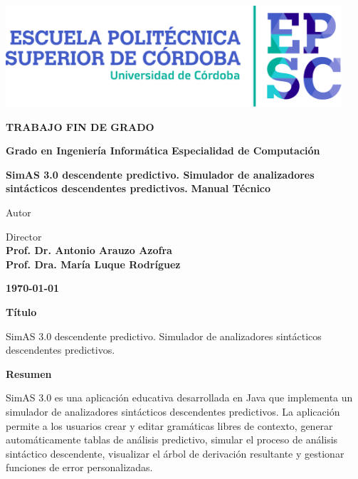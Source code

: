 \documentclass[a4paper,12pt,twoside,final]{book}
\begin{document}
\renewcommand*\listtablename{Índice de tablas}
\renewcommand{\tablename}{Tabla}
\begin{center}
\fontfamily{\sfdefault}\selectfont
\vspace*{2cm}

\vfill
\vfill
\includegraphics[width=12.5cm]{LogotipoEPSC.pdf}
\vfill
\vfill

\large\textbf{\color{epsc:medio}
  TRABAJO FIN DE GRADO
}
\vfill

\Large\textbf{\color{epsc:verde}
  Grado en Ingeniería Informática
}
\vfill
\Large\textbf{\color{epsc:verde}
  Especialidad de Computación
}
\vfill

\Huge\textbf{\color{epsc:oscuro}
  SimAS 3.0 descendente predictivo. Simulador de analizadores sintácticos descendentes predictivos.
}
\vfill
\vfill
\Large\textbf{\color{epsc:verde}
  Manual Técnico
}
\vfill
\vfill


\large{\color{epsc:oscuro}Autor}\\
\textbf{\color{epsc:medio}{D. Antonio Llamas García }}
\vfill

\large{\color{epsc:oscuro} Director }\\
\textbf{\color{epsc:medio} Prof. Dr. Antonio Arauzo Azofra}\\
\textbf{\color{epsc:medio} Prof. Dra. María Luque Rodríguez}
\vfill



\textbf{\color{epsc:verde} \monthyeardate\today}
\vfill
\vfill
\vspace{2.7cm}
\end{center}


\cleardoublepage

\thispagestyle{empty}
\pagecolor{white}

\Huge{\textbf{Título }}

\normalsize{SimAS 3.0 descendente predictivo. Simulador de analizadores sintácticos descendentes predictivos.}

\Large{\textbf{Resumen }}

\normalsize{SimAS 3.0 es una aplicación educativa desarrollada en Java que implementa un simulador de analizadores sintácticos descendentes predictivos. La aplicación permite a los usuarios crear y editar gramáticas libres de contexto, generar automáticamente tablas de análisis predictivo, simular el proceso de análisis sintáctico descendente, visualizar el árbol de derivación resultante y gestionar funciones de error personalizadas.}
\end{document}
